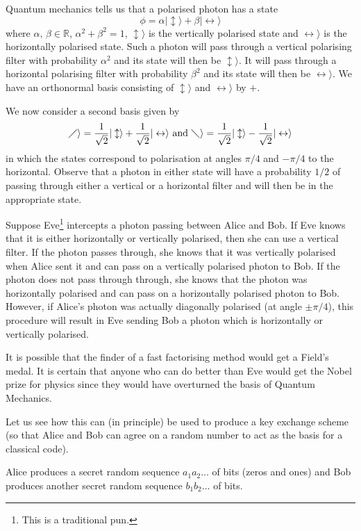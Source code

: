 \documentclass[12pt,a4paper]{article}
\theoremstyle{plain}
\theoremstyle{definition}
\begin{document}
Quantum mechanics tells us that a polarised photon
has a state
\[\phi=\alpha|\updownarrow\rangle+
\beta|\leftrightarrow\rangle\]
where $\alpha,\,\beta\in{\mathbb R}$,
$\alpha^{2}+\beta^{2}=1$, 
$\updownarrow\rangle$ is the vertically polarised
state and $\leftrightarrow\rangle$ is the
horizontally polarised state. Such a photon
will pass through a vertical polarising filter
with probability $\alpha^{2}$ 
and its state will then be $\updownarrow\rangle$.
It will pass through a horizontal polarising
filter with probability $\beta^{2}$ 
and its state will then be $\leftrightarrow\rangle$.
We have an orthonormal basis consisting of
$\updownarrow\rangle$
and $\leftrightarrow\rangle$ by $+$.

We now consider a second basis given
by
\[\diagup\rangle=\frac{1}{\sqrt 2}|\updownarrow\rangle+
\frac{1}{\sqrt 2}|\leftrightarrow\rangle
\ \text{and}
\ \diagdown\rangle=\frac{1}{\sqrt 2}|\updownarrow\rangle
-\frac{1}{\sqrt 2}|\leftrightarrow\rangle\]
in which the states correspond to polarisation
at angles $\pi/4$ and $-\pi/4$ to the horizontal.
Observe that a photon in either state
will have a probability $1/2$ of passing through
either a vertical or a horizontal filter
and  will then be in the appropriate state.

Suppose Eve\footnote{This is a traditional pun.}
intercepts a photon passing between Alice and Bob.
If Eve knows that it is either horizontally
or vertically polarised, then she can use a vertical
filter. If the photon passes through, she knows that
it was vertically polarised when Alice sent it
and can pass on a vertically polarised photon to Bob.
If the photon does not pass through through, she knows that
the photon was horizontally polarised
and can pass on a horizontally polarised photon to Bob.
However, if Alice's photon was actually diagonally
polarised (at angle $\pm\pi/4$), this procedure
will result in Eve sending Bob a photon which is
horizontally or vertically polarised.

It is possible that the finder of a fast factorising
method would get a Field's medal. It is certain that
anyone who can do better than Eve would get the Nobel 
prize for physics since they would have overturned
the basis of Quantum Mechanics.

Let us see how this can (in principle) be used
to produce a key exchange scheme
(so that Alice and Bob can agree on a random number
to act as the basis for a classical code).

 Alice produces a secret
random sequence $a_{1}a_{2}\dots$ of bits (zeros and ones)
and Bob produces another secret
random sequence $b_{1}b_{2}\dots$ of bits.
\end{document}
